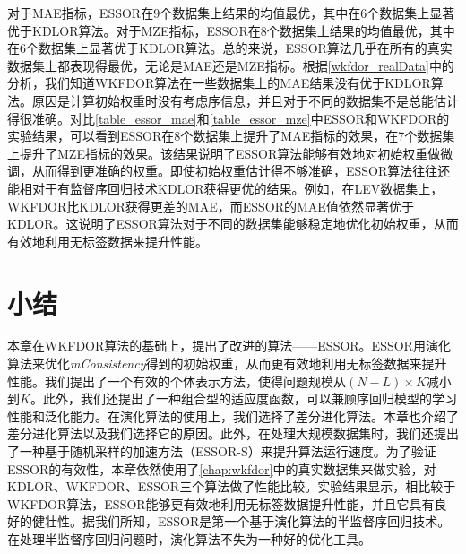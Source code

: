 对于MAE指标，ESSOR在9个数据集上结果的均值最优，其中在6个数据集上显著优于KDLOR算法。对于MZE指标，ESSOR在8个数据集上结果的均值最优，其中在6个数据集上显著优于KDLOR算法。总的来说，ESSOR算法几乎在所有的真实数据集上都表现得最优，无论是MAE还是MZE指标。根据\autoref{wkfdor_realData}中的分析，我们知道WKFDOR算法在一些数据集上的MAE结果没有优于KDLOR算法。原因是计算初始权重时没有考虑序信息，并且对于不同的数据集不是总能估计得很准确。对比\autoref{table_essor_mae}和\autoref{table_essor_mze}中ESSOR和WKFDOR的实验结果，可以看到ESSOR在8个数据集上提升了MAE指标的效果，在7个数据集上提升了MZE指标的效果。该结果说明了ESSOR算法能够有效地对初始权重做微调，从而得到更准确的权重。即使初始权重估计得不够准确，ESSOR算法往往还能相对于有监督序回归技术KDLOR获得更优的结果。例如，在LEV数据集上，WKFDOR比KDLOR获得更差的MAE，而ESSOR的MAE值依然显著优于KDLOR。这说明了ESSOR算法对于不同的数据集能够稳定地优化初始权重，从而有效地利用无标签数据来提升性能。

\section{小结}

本章在WKFDOR算法的基础上，提出了改进的算法——ESSOR。ESSOR用演化算法来优化\textit{mConsistency}得到的初始权重，从而更有效地利用无标签数据来提升性能。我们提出了一个有效的个体表示方法，使得问题规模从\((N-L) \times K\)减小到\(K\)。此外，我们还提出了一种组合型的适应度函数，可以兼顾序回归模型的学习性能和泛化能力。在演化算法的使用上，我们选择了差分进化算法。本章也介绍了差分进化算法以及我们选择它的原因。此外，在处理大规模数据集时，我们还提出了一种基于随机采样的加速方法（ESSOR-S）来提升算法运行速度。为了验证ESSOR的有效性，本章依然使用了\autoref{chap:wkfdor}中的真实数据集来做实验，对KDLOR、WKFDOR、ESSOR三个算法做了性能比较。实验结果显示，相比较于WKFDOR算法，ESSOR能够更有效地利用无标签数据提升性能，并且它具有良好的健壮性。据我们所知，ESSOR是第一个基于演化算法的半监督序回归技术。在处理半监督序回归问题时，演化算法不失为一种好的优化工具。

